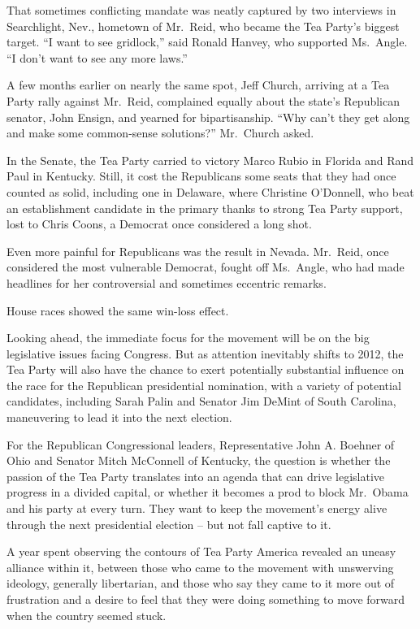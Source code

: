 ﻿\documentclass[12pt]{article}
\begin{document}
That sometimes conflicting mandate was neatly captured by two interviews in Searchlight, Nev.,
hometown of Mr.~Reid, who became the Tea Party's biggest target. ``I want to see gridlock,'' said
Ronald Hanvey, who supported Ms.~Angle. ``I don't want to see any more laws.''

A few months earlier on nearly the same spot, Jeff Church, arriving at a Tea Party rally against
Mr.~Reid, complained equally about the state's Republican senator, John Ensign, and yearned for
bipartisanship. ``Why can't they get along and make some common-sense solutions?'' Mr.~Church asked.

In the Senate, the Tea Party carried to victory Marco Rubio in Florida and Rand Paul in Kentucky.
Still, it cost the Republicans some seats that they had once counted as solid, including one in
Delaware, where Christine O'Donnell, who beat an establishment candidate in the primary thanks to
strong Tea Party support, lost to Chris Coons, a Democrat once considered a long shot.

Even more painful for Republicans was the result in Nevada. Mr.~Reid, once considered the most
vulnerable Democrat, fought off Ms.~Angle, who had made headlines for her controversial and
sometimes eccentric remarks.

House races showed the same win-loss effect.

Looking ahead, the immediate focus for the movement will be on the big legislative issues facing
Congress. But as attention inevitably shifts to 2012, the Tea Party will also have the chance to
exert potentially substantial influence on the race for the Republican presidential nomination, with
a variety of potential candidates, including Sarah Palin and Senator Jim DeMint of South Carolina,
maneuvering to lead it into the next election.

For the Republican Congressional leaders, Representative John A. Boehner of Ohio and Senator Mitch
McConnell of Kentucky, the question is whether the passion of the Tea Party translates into an
agenda that can drive legislative progress in a divided capital, or whether it becomes a prod to
block Mr.~Obama and his party at every turn. They want to keep the movement's energy alive through
the next presidential election -- but not fall captive to it.

A year spent observing the contours of Tea Party America revealed an uneasy alliance within it,
between those who came to the movement with unswerving ideology, generally libertarian, and those
who say they came to it more out of frustration and a desire to feel that they were doing something
to move forward when the country seemed stuck.
\end{document}
